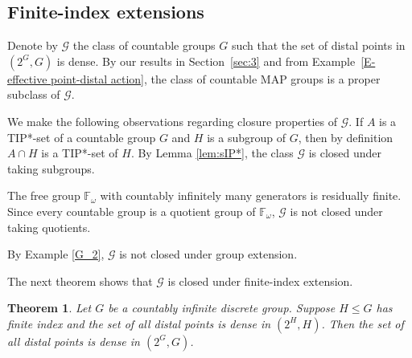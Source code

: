 \documentclass[11pt]{amsart}
\newtheorem{theorem}{Theorem}[section]
\theoremstyle{definition}
\numberwithin{equation}{section}
\theoremstyle{definition}
\begin{document}
\subsection{Finite-index extensions}\hfill

Denote by $\mathcal{G}$ the class of countable groups $G$ such that the set of distal points in $(2^G,G)$ is dense. By our results in Section~\ref{sec:3} and from Example~\ref{E-effective point-distal action}, the class of countable MAP groups is a proper subclass of $\mathcal{G}$. 

We make the following observations regarding closure properties of $\mathcal{G}$. If $A$ is a TIP*-set of a countable group $G$ and $H$ is a subgroup of $G$, then by definition $A\cap H$ is a TIP*-set of $H$. By Lemma \ref{lem:sIP*}, the class $\mathcal{G}$ is closed under taking subgroups. 

The free group $\mathbb{F}_\omega$ with countably infinitely many generators is residually finite. Since every countable group is a quotient group of $\mathbb{F}_\omega$, $\mathcal{G}$ is not closed under taking quotients. 

By Example \ref{G_2}, $\mathcal{G}$ is not closed under group extension. 

The next theorem shows that $\mathcal{G}$ is closed under finite-index extension.



\begin{theorem} Let $G$ be a countably infinite discrete group. Suppose $H\leq G$ has finite index and the set of all distal points is dense in $(2^H, H)$. Then the set of all distal points is dense in $(2^G, G)$.
\end{theorem}
\end{document}
